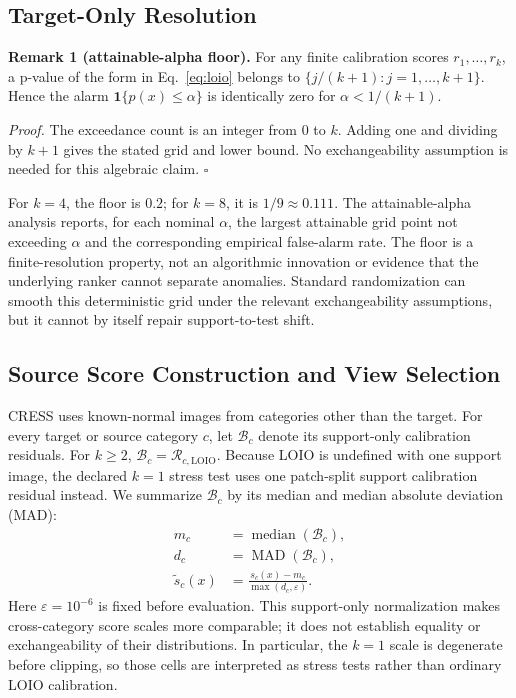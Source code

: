 \subsection{Target-Only Resolution}
\noindent\textbf{Remark 1 (attainable-alpha floor).} For any finite calibration scores $r_1,\ldots,r_k$, a p-value of the form in Eq.~\eqref{eq:loio} belongs to $\{j/(k{+}1):j=1,\ldots,k{+}1\}$. Hence the alarm $\mathbf{1}\{p(x)\leq\alpha\}$ is identically zero for $\alpha<1/(k{+}1)$.

\noindent\emph{Proof.} The exceedance count is an integer from 0 to $k$. Adding one and dividing by $k+1$ gives the stated grid and lower bound. No exchangeability assumption is needed for this algebraic claim. \hfill$\square$

For $k=4$, the floor is $0.2$; for $k=8$, it is $1/9\approx0.111$. The attainable-alpha analysis reports, for each nominal $\alpha$, the largest attainable grid point not exceeding $\alpha$ and the corresponding empirical false-alarm rate. The floor is a finite-resolution property, not an algorithmic innovation or evidence that the underlying ranker cannot separate anomalies. Standard randomization can smooth this deterministic grid under the relevant exchangeability assumptions, but it cannot by itself repair support-to-test shift.

\subsection{Source Score Construction and View Selection}\label{sec:cress-source-construction}
CRESS uses known-normal images from categories other than the target. For every target or source category $c$, let $\mathcal{B}_c$ denote its support-only calibration residuals. For $k\geq2$, $\mathcal{B}_c=\mathcal{R}_{c,\mathrm{LOIO}}$. Because LOIO is undefined with one support image, the declared $k=1$ stress test uses one patch-split support calibration residual instead. We summarize $\mathcal B_c$ by its median and median absolute deviation (MAD):
\begin{equation}\label{eq:cress-normalization}
\begin{aligned}
    m_c &= \operatorname{median}(\mathcal{B}_c),\\
    d_c &= \operatorname{MAD}(\mathcal{B}_c),\\
    \widetilde{s}_c(x) &= \frac{s_c(x)-m_c}{\max(d_c,\varepsilon)}.
\end{aligned}
\end{equation}
Here $\varepsilon=10^{-6}$ is fixed before evaluation. This support-only normalization makes cross-category score scales more comparable; it does not establish equality or exchangeability of their distributions. In particular, the $k=1$ scale is degenerate before clipping, so those cells are interpreted as stress tests rather than ordinary LOIO calibration.

